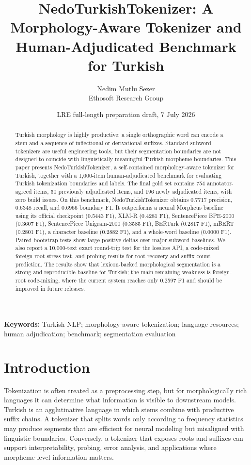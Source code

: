 \documentclass[11pt]{article}
\title{NedoTurkishTokenizer: A Morphology-Aware Tokenizer and Human-Adjudicated Benchmark for Turkish}
\author{Nedim Mutlu Sezer\\Ethosoft Research Group}
\date{LRE full-length preparation draft, 7 July 2026}
\begin{document}
\maketitle

\begin{abstract}
Turkish morphology is highly productive: a single orthographic word can encode a stem and a sequence of inflectional or derivational suffixes. Standard subword tokenizers are useful engineering tools, but their segmentation boundaries are not designed to coincide with linguistically meaningful Turkish morpheme boundaries. This paper presents NedoTurkishTokenizer, a self-contained morphology-aware tokenizer for Turkish, together with a 1,000-item human-adjudicated benchmark for evaluating Turkish tokenization boundaries and labels. The final gold set contains 754 annotator-agreed items, 50 previously adjudicated items, and 196 newly adjudicated items, with zero build issues. On this benchmark, NedoTurkishTokenizer obtains 0.7717 precision, 0.6348 recall, and 0.6966 boundary F1. It outperforms a neural Morpheus baseline using its official checkpoint (0.5443 F1), XLM-R (0.4281 F1), SentencePiece BPE-2000 (0.3607 F1), SentencePiece Unigram-2000 (0.3585 F1), BERTurk (0.2817 F1), mBERT (0.2801 F1), a character baseline (0.2882 F1), and a whole-word baseline (0.0000 F1). Paired bootstrap tests show large positive deltas over major subword baselines. We also report a 10,000-text exact round-trip test for the lossless API, a code-mixed foreign-root stress test, and probing results for root recovery and suffix-count prediction. The results show that lexicon-backed morphological segmentation is a strong and reproducible baseline for Turkish; the main remaining weakness is foreign-root code-mixing, where the current system reaches only 0.2597 F1 and should be improved in future releases.
\end{abstract}

\textbf{Keywords:} Turkish NLP; morphology-aware tokenization; language resources; human adjudication; benchmark; segmentation evaluation

\section{Introduction}
Tokenization is often treated as a preprocessing step, but for morphologically rich languages it can determine what information is visible to downstream models. Turkish is an agglutinative language in which stems combine with productive suffix chains. A tokenizer that splits words only according to frequency statistics may produce segments that are efficient for neural modeling but misaligned with linguistic boundaries. Conversely, a tokenizer that exposes roots and suffixes can support interpretability, probing, error analysis, and applications where morpheme-level information matters.
\end{document}
